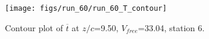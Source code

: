 \begin{figure}[H]
\centering
\texttt{[image: figs/run\_60/run\_60\_T\_contour]}
\caption{Contour plot of $\overline{t}$ at $z/c$=9.50, $V_{free}$=33.04, station 6.}
\end{figure}


